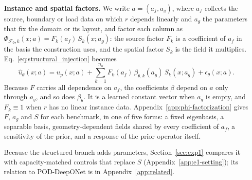 \documentclass{article}
\begin{document}
\textbf{Instance and spatial factors.}
We write $a=(a_f,a_g)$, where $a_f$ collects the source, boundary or load data on which $r$ depends linearly and $a_g$ the parameters that fix the domain or its layout, and factor each column as $\Phi_{\mathcal{F}_0,k}(x;a)=F_k(a_f)\,S_k(x;a_g)$: the source factor $F_k$ is a coefficient of $a_f$ in the basis the construction uses, and the spatial factor $S_k$ is the field it multiplies. Eq.~\ref{eq:structural_injection} becomes
\begin{equation}
\hat u_\theta(x;a)=u_p(x;a)+\sum_{k=1}^{n_b}F_k(a_f)\,\beta_{\theta,k}(a_g)\,S_k(x;a_g)+\epsilon_\theta(x;a).
\label{eq:factorized}
\end{equation}
Because $F$ carries all dependence on $a_f$, the coefficients $\beta$ depend on $a$ only through $a_g$, and so does $\beta_\theta$. It is a learned constant vector when $a_g$ is empty, and $F_k\equiv1$ when $r$ has no linear instance data. Appendix~\ref{app:phi-factorization} gives $F$, $a_g$ and $S$ for each benchmark, in one of five forms: a fixed eigenbasis, a separable basis, geometry-dependent fields shared by every coefficient of $a_f$, a sensitivity of the prior, and a response of the prior operator itself.

Because the structured branch adds parameters, Section~\ref{sec:exp1} compares it with capacity-matched controls that replace $S$ (Appendix~\ref{app:e1-setting}); its relation to POD-DeepONet \citep{lu2022} is in Appendix~\ref{app:related}.
\end{document}
